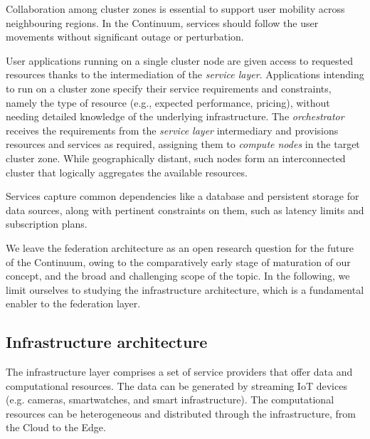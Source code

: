 Collaboration among cluster zones is essential to support user mobility across neighbouring regions. 
In the Continuum, services should follow the user movements without significant outage or perturbation.

User applications running on a single cluster node are given access to requested resources thanks to the intermediation of the \textit{service layer}. Applications intending to run on a cluster zone specify their service requirements and constraints, namely the type of resource (e.g., expected performance, pricing), without needing detailed knowledge of the underlying infrastructure. 
The \textit{orchestrator} receives the requirements from the \textit{service layer} intermediary and provisions resources and services as required, assigning them to \textit{compute nodes} in the target cluster zone.
While geographically distant, such nodes form an interconnected cluster that logically aggregates the available resources.

Services capture common dependencies like a database and persistent storage for data sources, along with pertinent constraints on them, such as latency limits and subscription plans.

We leave the federation architecture as an open research question for the future of the Continuum, owing to the comparatively early stage of maturation of our concept, and the broad and challenging scope of the topic. 
In the following, we limit ourselves to studying the infrastructure architecture, which is a fundamental enabler to the federation layer.

\subsection{Infrastructure architecture}

The infrastructure layer comprises a set of service providers that offer data and computational resources. The data can be generated by streaming IoT devices (e.g. cameras, smartwatches, and smart infrastructure). 
The computational resources can be heterogeneous and distributed through the infrastructure, from the Cloud to the Edge.

